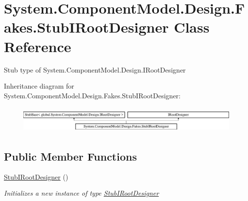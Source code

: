 \hypertarget{class_system_1_1_component_model_1_1_design_1_1_fakes_1_1_stub_i_root_designer}{\section{System.\-Component\-Model.\-Design.\-Fakes.\-Stub\-I\-Root\-Designer Class Reference}
\label{class_system_1_1_component_model_1_1_design_1_1_fakes_1_1_stub_i_root_designer}
}


Stub type of System.\-Component\-Model.\-Design.\-I\-Root\-Designer 


Inheritance diagram for System.\-Component\-Model.\-Design.\-Fakes.\-Stub\-I\-Root\-Designer\-:\begin{figure}[H]
\begin{center}
\leavevmode
\includegraphics[height=1.389578cm]{class_system_1_1_component_model_1_1_design_1_1_fakes_1_1_stub_i_root_designer}
\end{center}
\end{figure}
\subsection*{Public Member Functions}
\begin{DoxyCompactItemize}
\item 
\hyperlink{class_system_1_1_component_model_1_1_design_1_1_fakes_1_1_stub_i_root_designer_aeedfab4de7951c1b4efaaec0edfbc8db}{Stub\-I\-Root\-Designer} ()
\begin{DoxyCompactList}\small\item\em Initializes a new instance of type \hyperlink{class_system_1_1_component_model_1_1_design_1_1_fakes_1_1_stub_i_root_designer}{Stub\-I\-Root\-Designer}\end{DoxyCompactList}\end{DoxyCompactItemize}
